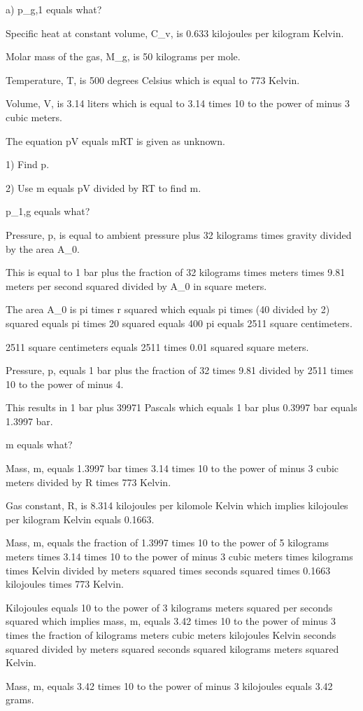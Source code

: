 a) p_{g,1} equals what?

Specific heat at constant volume, C_v, is 0.633 kilojoules per kilogram Kelvin.

Molar mass of the gas, M_g, is 50 kilograms per mole.

Temperature, T, is 500 degrees Celsius which is equal to 773 Kelvin.

Volume, V, is 3.14 liters which is equal to 3.14 times 10 to the power of minus 3 cubic meters.

The equation pV equals mRT is given as unknown.

1) Find p.

2) Use m equals pV divided by RT to find m.

p_{1,g} equals what?

Pressure, p, is equal to ambient pressure plus 32 kilograms times gravity divided by the area A_0.

This is equal to 1 bar plus the fraction of 32 kilograms times meters times 9.81 meters per second squared divided by A_0 in square meters.

The area A_0 is pi times r squared which equals pi times (40 divided by 2) squared equals pi times 20 squared equals 400 pi equals 2511 square centimeters.

2511 square centimeters equals 2511 times 0.01 squared square meters.

Pressure, p, equals 1 bar plus the fraction of 32 times 9.81 divided by 2511 times 10 to the power of minus 4.

This results in 1 bar plus 39971 Pascals which equals 1 bar plus 0.3997 bar equals 1.3997 bar.

m equals what?

Mass, m, equals 1.3997 bar times 3.14 times 10 to the power of minus 3 cubic meters divided by R times 773 Kelvin.

Gas constant, R, is 8.314 kilojoules per kilomole Kelvin which implies kilojoules per kilogram Kelvin equals 0.1663.

Mass, m, equals the fraction of 1.3997 times 10 to the power of 5 kilograms meters times 3.14 times 10 to the power of minus 3 cubic meters times kilograms times Kelvin divided by meters squared times seconds squared times 0.1663 kilojoules times 773 Kelvin.

Kilojoules equals 10 to the power of 3 kilograms meters squared per seconds squared which implies mass, m, equals 3.42 times 10 to the power of minus 3 times the fraction of kilograms meters cubic meters kilojoules Kelvin seconds squared divided by meters squared seconds squared kilograms meters squared Kelvin.

Mass, m, equals 3.42 times 10 to the power of minus 3 kilojoules equals 3.42 grams.